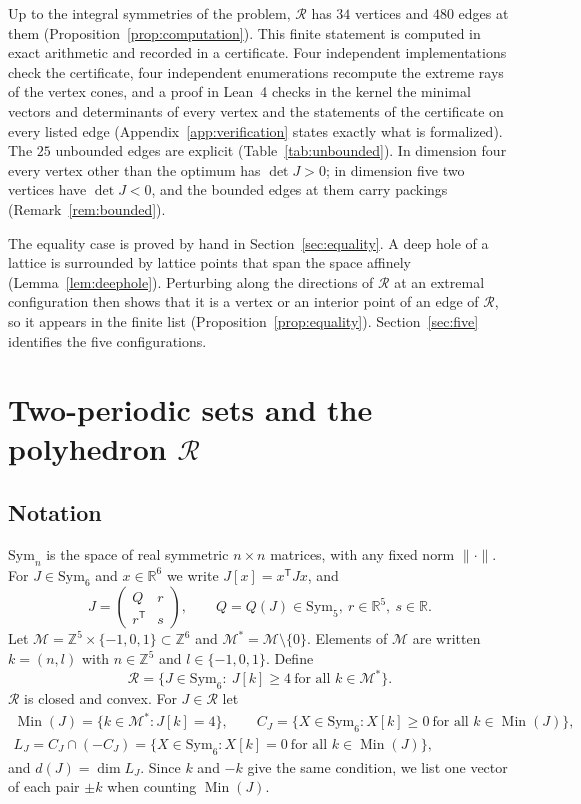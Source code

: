 \documentclass[11pt]{amsart}
\theoremstyle{definition}
\theoremstyle{remark}
\numberwithin{equation}{section}
\numberwithin{table}{section}
\numberwithin{figure}{section}
\newcommand{\R}{\mathbb{R}}
\newcommand{\Z}{\mathbb{Z}}
\newcommand{\M}{\mathcal{M}}
\newcommand{\Rk}{\mathcal{R}}
\newcommand{\Sym}{\mathrm{Sym}}
\newcommand{\Min}{\operatorname{Min}}
\newcommand{\T}{\mathsf{T}}
\begin{document}
Up to the integral symmetries of the problem, $\Rk$ has $34$ vertices and $480$ edges at them (Proposition~\ref{prop:computation}). This finite statement is computed in exact arithmetic and recorded in a certificate. Four independent implementations check the certificate, four independent enumerations recompute the extreme rays of the vertex cones, and a proof in Lean~4 checks in the kernel the minimal vectors and determinants of every vertex and the statements of the certificate on every listed edge (Appendix~\ref{app:verification} states exactly what is formalized). The $25$ unbounded edges are explicit (Table~\ref{tab:unbounded}). In dimension four every vertex other than the optimum has $\det J>0$; in dimension five two vertices have $\det J<0$, and the bounded edges at them carry packings (Remark~\ref{rem:bounded}).

The equality case is proved by hand in Section~\ref{sec:equality}. A deep hole of a lattice is surrounded by lattice points that span the space affinely (Lemma~\ref{lem:deephole}). Perturbing along the directions of $\Rk$ at an extremal configuration then shows that it is a vertex or an interior point of an edge of $\Rk$, so it appears in the finite list (Proposition~\ref{prop:equality}). Section~\ref{sec:five} identifies the five configurations.

\section{Two-periodic sets and the polyhedron \texorpdfstring{$\Rk$}{R}}\label{sec:polyhedron}

\subsection{Notation}
$\Sym_n$ is the space of real symmetric $n\times n$ matrices, with any fixed norm $\|\cdot\|$. For $J\in\Sym_6$ and $x\in\R^6$ we write $J[x]=x^\T Jx$, and
\[
J=\begin{pmatrix}Q&r\\ r^\T&s\end{pmatrix},\qquad Q=Q(J)\in\Sym_5,\ r\in\R^5,\ s\in\R .
\]
Let $\M=\Z^5\times\{-1,0,1\}\subset\Z^6$ and $\M^*=\M\setminus\{0\}$. Elements of $\M$ are written $k=(n,l)$ with $n\in\Z^5$ and $l\in\{-1,0,1\}$. Define
\[
\Rk=\{J\in\Sym_6:\ J[k]\ge4\ \text{for all }k\in\M^*\}.
\]
$\Rk$ is closed and convex. For $J\in\Rk$ let
\begin{gather*}
\Min(J)=\{k\in\M^*:J[k]=4\},\qquad C_J=\{X\in\Sym_6: X[k]\ge0\ \text{for all } k\in\Min(J)\},\\
L_J=C_J\cap(-C_J)=\{X\in\Sym_6:X[k]=0\ \text{for all }k\in\Min(J)\},
\end{gather*}
and $d(J)=\dim L_J$. Since $k$ and $-k$ give the same condition, we list one vector of each pair $\pm k$ when counting $\Min(J)$.
\end{document}
